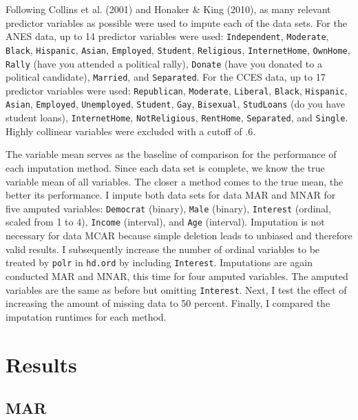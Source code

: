 \documentclass[12pt,econ]{sources/authesis}
\begin{document}
Following Collins et al. (2001) and Honaker \& King (2010), as many relevant predictor variables as possible were used to impute each of the data sets. For the ANES data, up to 14 predictor variables were used: \texttt{Independent}, \texttt{Moderate}, \texttt{Black}, \texttt{Hispanic}, \texttt{Asian}, \texttt{Employed}, \texttt{Student}, \texttt{Religious}, \texttt{InternetHome}, \texttt{OwnHome}, \texttt{Rally} (have you attended a political rally), \texttt{Donate} (have you donated to a political candidate), \texttt{Married}, and \texttt{Separated}. For the CCES data, up to 17 predictor variables were used: \texttt{Republican}, \texttt{Moderate}, \texttt{Liberal}, \texttt{Black}, \texttt{Hispanic}, \texttt{Asian}, \texttt{Employed}, \texttt{Unemployed}, \texttt{Student}, \texttt{Gay}, \texttt{Bisexual}, \texttt{StudLoans} (do you have student loans), \texttt{InternetHome}, \texttt{NotReligious}, \texttt{RentHome}, \texttt{Separated}, and \texttt{Single}. Highly collinear variables were excluded with a cutoff of .6.

The variable mean serves as the baseline of comparison for the performance of each imputation method. Since each data set is complete, we know the true variable mean of all variables. The closer a method comes to the true mean, the better its performance. I impute both data sets for data MAR and MNAR for five amputed variables: \texttt{Democrat} (binary), \texttt{Male} (binary), \texttt{Interest} (ordinal, scaled from 1 to 4), \texttt{Income} (interval), and \texttt{Age} (interval). Imputation is not necessary for data MCAR because simple deletion leads to unbiased and therefore valid results. I subsequently increase the number of ordinal variables to be treated by \texttt{polr} in \texttt{hd.ord} by including \texttt{Interest}. Imputations are again conducted MAR and MNAR, this time for four amputed variables. The amputed variables are the same as before but omitting \texttt{Interest}. Next, I test the effect of increasing the amount of missing data to 50 percent. Finally, I compared the imputation runtimes for each method.

\hypertarget{ordmiss-results}{%
\section{Results}\label{ordmiss-results}}

\hypertarget{ordmiss-results-mar}{%
\subsection{MAR}\label{ordmiss-results-mar}}
\end{document}
